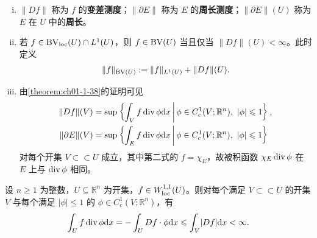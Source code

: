 \documentclass[../../main.tex]{subfiles}%
\begin{document}
\begin{remark}\label{remark:ch05-def-5-1-范数}
\begin{enumerate}[(i)]
\item $\lVert Df\rVert$ 称为 $f$ 的\textbf{变差测度}；$\lVert\partial E\rVert$ 称为 $E$ 的\textbf{周长测度}；$\lVert\partial E\rVert(U)$ 称为 $E$ 在 $U$ 中的\textbf{周长}。
\item 若 $f\in\mathrm{BV}_{\mathrm{loc}}(U)\cap L^1(U)$，则 $f\in\mathrm{BV}(U)$ 当且仅当 $\lVert Df\rVert(U)<\infty$。此时定义
\begin{align*}
\lVert f\rVert_{\mathrm{BV}(U)}:=\lVert f\rVert_{L^1(U)}+\lVert Df\rVert(U).
\end{align*}
\item 由\cref{theorem:ch01-1-38}的证明可见%
\begin{align*}
\lVert Df\rVert(V)&=\sup\left\{\int_V f\diver\phi\diff x\,\middle|\,\phi\in C_c^1(V;\mathbb{R}^n),\ \lvert\phi\rvert\leqslant1\right\},\\
\lVert\partial E\rVert(V)&=\sup\left\{\int_E f\diver\phi\diff x\,\middle|\,\phi\in C_c^1(V;\mathbb{R}^n),\ \lvert\phi\rvert\leqslant1\right\}
\end{align*}
对每个开集 $V\subset\subset U$ 成立，其中第二式的 $f=\chi_E$，故被积函数 $\chi_E\operatorname{div}\phi$ 在 $E$ 上与 $\operatorname{div}\phi$ 相同。
\end{enumerate}
\end{remark}

\begin{example}\label{example:ch05-exa-5-1-Sobolev}
设 $n\geqslant1$ 为整数，$U\subseteq\mathbb{R}^n$ 为开集，$f\in W^{1,1}_{\mathrm{loc}}(U)$。则对每个满足 $V\subset\subset U$ 的开集 $V$ 与每个满足 $\lvert\phi\rvert\leqslant1$ 的 $\phi\in C_c^1(V;\mathbb{R}^n)$，有
\begin{align*}
\int_U f\operatorname{div}\phi\mathrm{d} x=-\int_U Df\cdot\phi\mathrm{d} x\leqslant\int_V\lvert Df\rvert\mathrm{d} x<\infty .
\end{align*}
\end{example}
\end{document}
